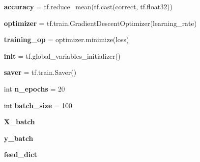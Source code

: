 \begin{DoxyCompactItemize}
{\bfseries accuracy} = tf.\+reduce\+\_\+mean(tf.\+cast(correct, tf.\+float32))
\item
\mbox{\label{namespacechemistry2quant_1_1chem2quant__NN_af457ddc7b0e03be335894a03077fd8b7}}
{\bfseries optimizer} = tf.\+train.\+Gradient\+Descent\+Optimizer(learning\+\_\+rate)
\item
\mbox{\label{namespacechemistry2quant_1_1chem2quant__NN_acba1c26abce105144e8f0d60a1068c79}}
{\bfseries training\+\_\+op} = optimizer.\+minimize(loss)
\item
\mbox{\label{namespacechemistry2quant_1_1chem2quant__NN_ae4aff91e0d7af103eaaef10b18075253}}
{\bfseries init} = tf.\+global\+\_\+variables\+\_\+initializer()
\item
\mbox{\label{namespacechemistry2quant_1_1chem2quant__NN_a70d2c6378062ed0ad4bde95cebafd57d}}
{\bfseries saver} = tf.\+train.\+Saver()
\item
\mbox{\label{namespacechemistry2quant_1_1chem2quant__NN_a83b2d2aff8b2b1a37c2d97ae7aa35ba1}}
int {\bfseries n\+\_\+epochs} = 20
\item
\mbox{\label{namespacechemistry2quant_1_1chem2quant__NN_afcd6b36a19d229a0b649ea567b898156}}
int {\bfseries batch\+\_\+size} = 100
\item
\mbox{\label{namespacechemistry2quant_1_1chem2quant__NN_ade7be0b947adc0fefec69bbd6075f27f}}
{\bfseries X\+\_\+batch}
\item
\mbox{\label{namespacechemistry2quant_1_1chem2quant__NN_a43d2f31fbb7c1ebc130e3e600484529d}}
{\bfseries y\+\_\+batch}
\item
\mbox{\label{namespacechemistry2quant_1_1chem2quant__NN_a63bedc3cdcc2284801b22869eee073de}}
{\bfseries feed\+\_\+dict}
\item
\mbox{\label{namespacechemistry2quant_1_1chem2quant__NN_a4a3a2f40fbba7b1aa0688e669b322f6f}}

\end{DoxyCompactItemize}
